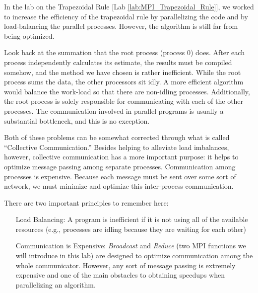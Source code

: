 \label{lab:MPI_Collective_Communication}

In the lab on the Trapezoidal Rule [Lab \ref{lab:MPI_Trapezoidal_Rule}], we worked to increase the efficiency of the trapezoidal rule by parallelizing the code and by load-balancing the parallel processes. However, the algorithm is still far from being optimized.

Look back at the summation that the root process (process 0) does. After each process independently calculates its estimate, the results must be compiled somehow, and the method we have chosen is rather inefficient. While the root process sums the data, the other processors sit idly. A more efficient algorithm would balance the work-load so that there are non-idling processes. Additionally, the root process is solely responsible for communicating with each of the other processes. The communication involved in parallel programs is usually a substantial bottleneck, and this is no exception. 

Both of these problems can be somewhat corrected through what is called ``Collective Communication.'' Besides helping to alleviate load imbalances, however, collective communication has a more important purpose: it helps to optimize message passing among separate processes. Communication among processes is expensive. Because each message must be sent over some sort of network, we must minimize and optimize this inter-process communication.

There are two important principles to remember here:
\begin{enumerate}
\item[Load Balancing:]
A program is inefficient if it is not using all of the available resources (e.g., processes are idling because they are waiting for each other)
\item[Communication is Expensive:]
\emph{Broadcast} and \emph{Reduce} (two MPI functions we will introduce in this lab) are designed to optimize communication among the whole communicator. However, any sort of message passing is extremely expensive and one of the main obstacles to obtaining speedups when parallelizing an algorithm.
\end{enumerate}


